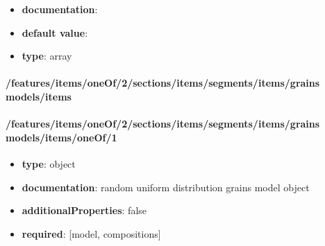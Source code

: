 \begin{itemize}\item {\bf documentation}: 
\item {\bf default value}: 
\item {\bf type}: array
\end{itemize}\paragraph{/features/items/oneOf/2/sections/items/segments/items/grains models/items}

\paragraph{/features/items/oneOf/2/sections/items/segments/items/grains models/items/oneOf/1}
\begin{itemize}\item {\bf type}: object
\item {\bf documentation}: random uniform distribution grains model object
\item {\bf additionalProperties}: false
\item {\bf required}: [model, compositions]\end{itemize}
